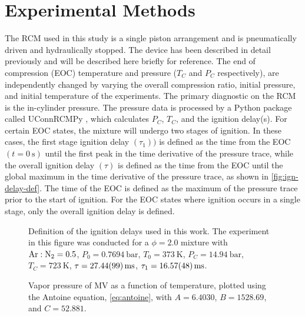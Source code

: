 \documentclass[12pt]{../ussci}
\begin{document}
\section{Experimental Methods}\label{sec:experimental-methods}

The RCM used in this study is a single piston arrangement and is pneumatically
driven and hydraulically stopped. The device has been described in detail
previously \autocite{Mittal2007a} and will be described here briefly for
reference. The end of compression (EOC) temperature and pressure (\(T_C\) and
\(P_C\) respectively), are independently changed by varying the overall
compression ratio, initial pressure, and initial temperature of the experiments. The primary diagnostic on the RCM is the in-cylinder pressure. The pressure data
is processed by a Python package called UConnRCMPy
\autocite{uconnrcmpy,Weber2016a}, which calculates \(P_C\), \(T_C\), and the ignition
delay(s). For certain EOC states, the mixture will undergo two stages of
ignition. In these cases, the first stage ignition delay \((\tau_1))\) is
defined as the time from the EOC \((t=\SI{0}{\s})\) until the first peak in the
time derivative of the pressure trace, while the overall ignition delay
\((\tau)\) is defined as the time from the EOC until the global maximum in the
time derivative of the pressure trace, as shown in \cref{fig:ign-delay-def}. The
time of the EOC is defined as the maximum of the pressure trace prior to the
start of ignition. For the EOC states where ignition occurs in a single stage,
only the overall ignition delay is defined.

\begin{figure}[htbp]
    \begin{minipage}[t]{0.48\textwidth}
        \centering
        \resizebox{\linewidth}{!}{}
        \caption{Definition of the ignition delays used in this work. The
        experiment in this figure was conducted for a \(\phi=2.0\) mixture with
        \mbox{\(\ce{Ar}:\ce{N2}=0.5\)}, \(P_0=\SI{0.7694}{\bar}\),
        \(T_0=\SI{373}{\K}\), \(P_C=\SI{14.94}{\bar}\), \(T_C=\SI{723}{\K}\),
        \(\tau=\SI{27.44\pm0.99}{\ms}\), \(\tau_1=\SI{16.57\pm0.48}{\ms}\).}
        \label{fig:ign-delay-def}
    \end{minipage}\hfill%
    \begin{minipage}[t]{0.48\textwidth}
        \centering
        \resizebox{\linewidth}{!}{}
        \caption{Vapor pressure of MV as a function of temperature, plotted
        using the Antoine equation, \cref{eq:antoine}, with \(A=6.4030\), \(B=1528.69\), and \(C=52.881\).}
        \label{fig:vapor-pressure}
    \end{minipage}
\end{figure}
\end{document}
